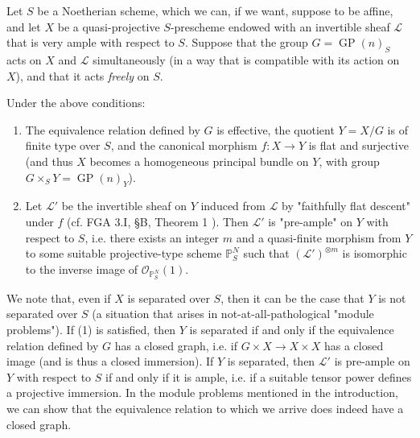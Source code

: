 Let $S$ be a Noetherian scheme, which we can, if we want, suppose to be affine, and let $X$ be a quasi-projective $S$-prescheme endowed with an invertible sheaf $\mathcal{L}$ that is very ample with respect to $S$.
Suppose that the group $G=\operatorname{GP}(n)_S$ acts on $X$ and $\mathcal{L}$ simultaneously (in a way that is compatible with its action on $X$), and that it acts \emph{freely} on $S$.


\begin{conjecture}\label{fga3.iii-8-conjecture-8.1}
    Under the above conditions:

    \begin{enumerate}
        \item The equivalence relation defined by $G$ is effective, the quotient $Y=X/G$ is of finite type over $S$, and the canonical morphism $f\colon X\to Y$ is flat and surjective (and thus $X$ becomes a homogeneous principal bundle on $Y$, with group $G\times_S Y=\operatorname{GP}(n)_Y$).
        \item Let $\mathcal{L}'$ be the invertible sheaf on $Y$ induced from $\mathcal{L}$ by "faithfully flat descent" under $f$ (cf. FGA 3.I, §B, Theorem 1 ).
              Then $\mathcal{L}'$ is "pre-ample" on $Y$ with respect to $S$, i.e. there exists an integer $m$ and a quasi-finite morphism from $Y$ to some suitable projective-type scheme $\mathbb{P}_S^N$ such that $(\mathcal{L}')^{\otimes m}$ is isomorphic to the inverse image of $\mathcal{O}_{\mathbb{P}_S^N}(1)$.
    \end{enumerate}
\end{conjecture}


We note that, even if $X$ is separated over $S$, then it can be the case that $Y$ is not separated over $S$ (a situation that arises in not-at-all-pathological "module problems").
If (1) is satisfied, then $Y$ is separated if and only if the equivalence relation defined by $G$ has a closed graph, i.e. if $G\times X\to X\times X$ has a closed image (and is thus a closed immersion).
If $Y$ is separated, then $\mathcal{L}'$ is pre-ample on $Y$ with respect to $S$ if and only if it is ample, i.e. if a suitable tensor power defines a projective immersion.
In the module problems mentioned in the introduction, we can show that the equivalence relation to which we arrive does indeed have a closed graph.


